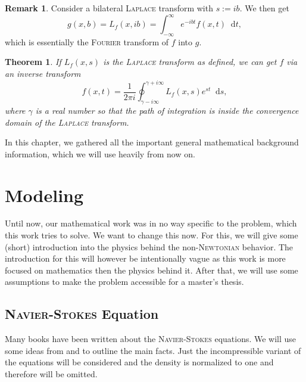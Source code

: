 \documentclass[12pt,a4paper,twoside, open=right]{scrreprt}
\theoremstyle{definition}
\newtheorem{rem}[auf]{Remark}
\theoremstyle{plain}
\newtheorem{sa}[auf]{Theorem}
\newcommand{\D}{\mathop{}\!\mathrm{d}}
\begin{document}
\begin{rem}
    Consider a bilateral \textsc{Laplace} transform with $s:=ib$. We then get
    \begin{equation}
        g(x,b)=L_f(x,ib)=\int_{-\infty}^\infty e^{-ibt}f(x,t)\D t,
    \end{equation}
    which is essentially the \textsc{Fourier} transform of $f$ into $g$.
\end{rem}
\begin{sa}
    If $L_f(x,s) $ is the \textsc{Laplace} transform as defined, we can get $f$ via an inverse transform
    \begin{equation}
        f(x,t) = \frac{1}{2\pi i}\oint_{\gamma-i\infty}^{\gamma +i\infty}L_f(x,s)e^{st}\D s,
    \end{equation}
    where $\gamma$ is a real number so that the path of integration is inside the convergence domain of the \textsc{Laplace} transform.
\end{sa}
In this chapter, we gathered all the important general mathematical background information, which we will use heavily from now on. 
\chapter{Modeling}
\label{ch:model}
Until now, our mathematical work was in no way specific to the problem, which this work tries to solve. We want to change this now. For this, we will give some (short) introduction into the physics behind the non-\textsc{Newtonian} behavior. The introduction for this will however be intentionally vague as this work is more focused on mathematics then the physics behind it. After that, we will use some assumptions to make the problem accessible for a master's thesis.
\section{\textsc{Navier-Stokes} Equation}
Many books have been written about the \textsc{Navier-Stokes} equations. We will use some ideas from \cite{Lukaszewicz2016} and \cite{White2006} to outline the main facts. Just the incompressible variant of the equations will be considered and the density is normalized to one and therefore will be omitted.
\end{document}
